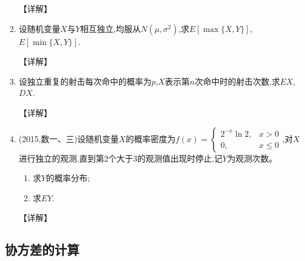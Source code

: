 \documentclass[12pt, a4paper, oneside, UTF8]{ctexbook}
\begin{document}
\begin{enumerate}[label=\arabic*.]
    \begin{solution}
    【详解】
    \end{solution}
    
    \item 设随机变量$X$与$Y$相互独立,均服从$N(\mu,\sigma^2)$,求$E[\max\{X,Y\}]$,$E[\min\{X,Y\}]$.
    
    \begin{solution}
    【详解】
    \end{solution}
    
    \item 设独立重复的射击每次命中的概率为$p$,$X$表示第$n$次命中时的射击次数,求$EX$,$DX$.
    
    \begin{solution}
    【详解】
    \end{solution}
    
    \item  (2015,数一、三)设随机变量$X$的概率密度为$f(x)=\begin{cases}2^{-x}\ln2, & x>0 \\ 0, & x\leq0\end{cases}$,对$X$进行独立的观测,直到第2个大于3的观测值出现时停止,记$Y$为观测次数。
    \begin{enumerate}
        \item 求$Y$的概率分布;
        \item 求$EY$.
    \end{enumerate}
    
    \begin{solution}
    【详解】
    \end{solution}
\end{enumerate}

\subsection{协方差的计算}
\end{document}
